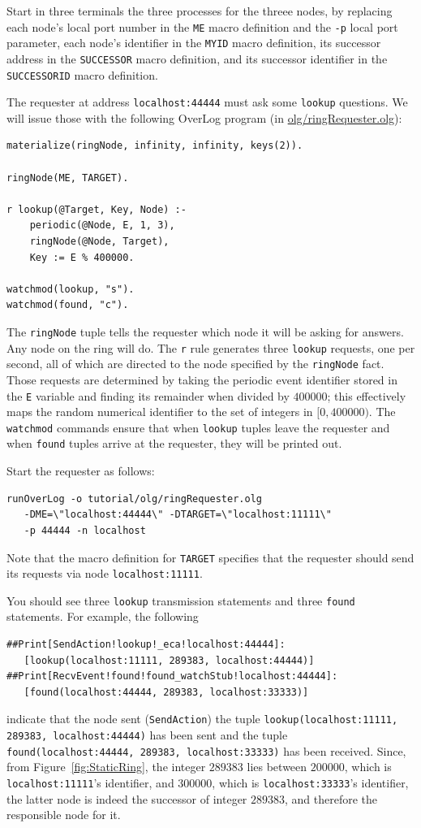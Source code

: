\documentclass{article}
\begin{document}
Start in three terminals the three processes for the threee nodes, by
replacing each node's local port number in the \texttt{ME} macro definition and the
\texttt{-p} local port parameter, each node's identifier in the
\texttt{MYID} macro definition, its successor address in the \texttt{SUCCESSOR}
macro definition, and
its successor identifier in the \texttt{SUCCESSORID} macro definition.


The requester at address \lstinline$localhost:44444$ must ask some
\lstinline$lookup$ questions. We will issue those with the following
OverLog program (in \url{olg/ringRequester.olg}):
\begin{lstlisting}
materialize(ringNode, infinity, infinity, keys(2)).

ringNode(ME, TARGET).

r lookup(@Target, Key, Node) :-
	periodic(@Node, E, 1, 3),
 	ringNode(@Node, Target),
	Key := E % 400000.

watchmod(lookup, "s").
watchmod(found, "c").
\end{lstlisting}
The \lstinline$ringNode$ tuple tells the requester which node it will be
asking for answers. Any node on the ring will do.  The \lstinline$r$
rule generates three \lstinline$lookup$ requests, one per second, all of
which are directed to the node specified by the \lstinline$ringNode$
fact.  Those requests are determined by taking the periodic event
identifier stored in the \lstinline$E$ variable and finding its
remainder when divided by $400000$; this effectively maps the random
numerical identifier to the set of integers in $[0,400000)$. The
\lstinline$watchmod$ commands ensure that when \lstinline$lookup$
tuples leave the requester and when
\lstinline$found$ tuples arrive at the requester, they will be printed out.

Start the requester as follows:
\begin{verbatim}
runOverLog -o tutorial/olg/ringRequester.olg
   -DME=\"localhost:44444\" -DTARGET=\"localhost:11111\"
   -p 44444 -n localhost
\end{verbatim}
Note that the macro definition for \texttt{TARGET} specifies that the
requester should send its requests via node \lstinline$localhost:11111$.

You should see three \lstinline$lookup$ transmission statements and
three \lstinline$found$ statements. For example, the following
\begin{verbatim}
##Print[SendAction!lookup!_eca!localhost:44444]:
   [lookup(localhost:11111, 289383, localhost:44444)]
##Print[RecvEvent!found!found_watchStub!localhost:44444]:
   [found(localhost:44444, 289383, localhost:33333)]
\end{verbatim}
indicate that the node sent (\texttt{SendAction}) the tuple
\lstinline$lookup(localhost:11111, 289383, localhost:44444)$ has been
sent and the tuple \lstinline$found(localhost:44444, 289383, localhost:33333)$ has been received.
Since, from Figure~\ref{fig:StaticRing}, the integer $289383$ lies
between $200000$, which is \lstinline$localhost:11111$'s identifier, and
$300000$, which is \lstinline$localhost:33333$'s identifier, the latter
node is indeed the successor of integer $289383$, and therefore the
responsible node for it.
\end{document}
